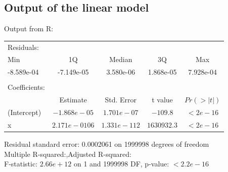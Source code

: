 \documentclass[a4paper, 10pt, envcountsect, runningheads]{article}
\numberwithin{figure}{section}
\numberwithin{equation}{section}
\begin{document}
\subsection{Output of the linear model}\label{A:diagrams}
Output from R:
\begin{tabular}{lcccc}
Residuals:&&&&\\
Min & 1Q & Median & 3Q & Max\\ 
-8.589e-04 & -7.149e-05 & 3.580e-06 & 1.868e-05 & 7.928e-04 \\
&&&&\\
Coefficients:&&&&\\
					& Estimate & Std. Error & t value & $Pr(>|t|)$    \\
(Intercept) & $-1.868e-05$ &  $1.701e-07$  &  $-109.8$ & $< 2e-16$\\
x          &  $2.171e-0106$ & $1.331e-112$ & $1630932.3$ & $< 2e-16$\\
\end{tabular}
Residual standard error: 0.0002061 on 1999998 degrees of freedom\\
Multiple R-squared:,\quad Adjusted R-squared: \\
F-statistic: $2.66e+12$ on 1 and 1999998 DF,  p-value: $< 2.2e-16$
\end{document}
